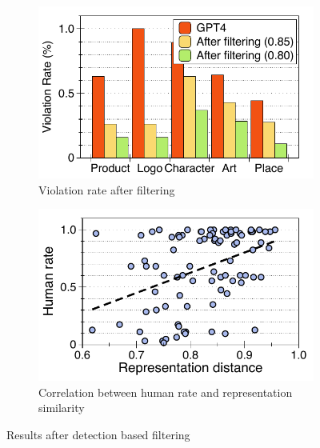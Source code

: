 
\begin{figure}[t]
    \begin{minipage}[b]{0.33\textwidth}
        \begin{subfigure}[t]{0.98\linewidth}
            \centering
            \includegraphics[width=0.9\linewidth]{figure_folder/filtering.pdf}
            \vspace{-0.1in}
            \caption{\small Violation rate after filtering}
            \label{figa:target_concept}
        \end{subfigure}
        \hfill
        \begin{subfigure}[t]{0.98\linewidth}
            \centering
            \includegraphics[width=0.9\linewidth]{figure_folder/human_rep_diff.pdf}
            \vspace{-0.1in}
            \caption{\small Correlation between human rate and representation similarity}
            \label{figb:correlation_human_rep}
        \end{subfigure}
        \vspace{-0.1in}
        \caption{\small Results after detection based filtering}

\end{minipage}
\end{figure}

